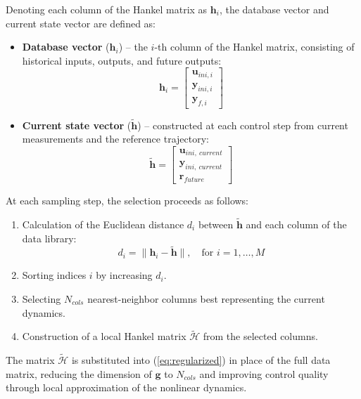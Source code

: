 Denoting each column of the Hankel matrix as $\boldsymbol{h}_i$, the database vector and current state vector are defined as:
\begin{itemize}
    \item \textbf{Database vector} ($\boldsymbol{h}_i$) -- the $i$-th column of the Hankel matrix, consisting of historical inputs, outputs, and future outputs:
    \begin{equation}
        \boldsymbol{h}_i = 
        \begin{bmatrix}
        \boldsymbol{u}_{{ini}, i} \\
            \boldsymbol{y}_{{ini}, i} \\
            \boldsymbol{y}_{f, i}
        \end{bmatrix}
    \end{equation}
    
    \item \textbf{Current state vector} ($\boldsymbol{\tilde{h}}$) -- constructed at each control step from current measurements and the reference trajectory:
    \begin{equation}
        \boldsymbol{\tilde{h}} = 
        \begin{bmatrix}
            \boldsymbol{u}_{{ini},~{current}} \\
            \boldsymbol{y}_{{ini},~{current}} \\
            \boldsymbol{r}_{{future}}
        \end{bmatrix}
    \end{equation}
\end{itemize}

At each sampling step, the selection proceeds as follows:
\begin{enumerate}
    \item Calculation of the Euclidean distance $d_i$ between $\boldsymbol{\tilde{h}}$ and each column of the data library:
    \begin{equation}
        d_i = \| \boldsymbol{h}_i - \boldsymbol{\tilde{h}} \|, \quad \text{for } i = 1, \dots, M
    \end{equation}
    \item Sorting indices $i$ by increasing $d_i$.
    \item Selecting $N_{cols}$ nearest-neighbor columns best representing the current dynamics.
    \item Construction of a local Hankel matrix $\mathcal{\tilde H}$ from the selected columns.
\end{enumerate}

The matrix $\mathcal{\tilde H}$ is substituted into (\ref{eq:regularized}) in place of the full data matrix, reducing the dimension of $\boldsymbol{g}$ to $N_{cols}$ and improving control quality through local approximation of the nonlinear dynamics.